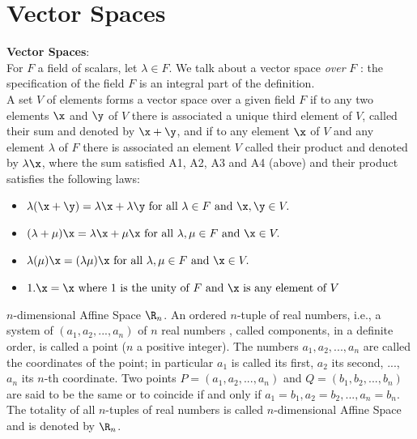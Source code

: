 \section{Vector Spaces}

\begin{definition}{\bf Vector Spaces}:\\
For $F$ a field of scalars, let $\lambda \in F$. We talk about a vector space {\it over } $F$ : the specification of the field $F$ is an integral part of the definition. \\

A set $V$ of elements forms a vector space over a given field $F$ if to any two elements $\x$ and $\y$ of $V$ there is associated a unique third element of $V$, called their sum and denoted by
$\x + \y$, and if to any element $\x$ of $V$ and any element $\lambda$ of $F$ there is associated an element $V$ called their product and denoted by $\lambda \x$, where the sum satisfied A1, A2, A3 and A4 (above)
and their product satisfies the following laws: 
 
\begin{itemize}
\item[V1:]  $\lambda (\x + \y) = \lambda\x + \lambda\y \mbox{ for all } \lambda \in F \mbox{ and } \x,\y \in  V.$
\item[V2:]  $(\lambda + \mu)\x = \lambda\x + \mu\x \mbox{ for all } \lambda,\mu \in F \mbox{ and } \x  \in  V.$
\item[V3:]  $\lambda(\mu)\x = (\lambda\mu)\x \mbox{ for all } \lambda,\mu \in F \mbox{ and } \x  \in  V.$
\item[V4:]  $1.\x = \x \mbox{ where 1 is the unity of }  F \mbox{ and } \x \mbox{ is any element of } V$
\end{itemize}
\end{definition}

\begin{definition}
$n$-dimensional Affine Space $\R_n$. An ordered $n$-tuple of real numbers, i.e., a system of $(a_1, a_2, ..., a_n)$ of $n$ real numbers , called components, in a definite order, is called a point ($n$ a positive integer). The numbers $a_1,a_2, ...,a_n$ are called the coordinates of the point; in particular $a_1$ is called its first, $a_2$ its second, ..., $a_n$ its $n$-th coordinate. Two points $P=(a_1,a_2,...,a_n)$ and $Q = (b_1,b_2,...,b_n)$ are said to 
be the {\elevenit same} or to coincide if and only if $a_1 = b_1, a_2 = b_2, ..., a_n = b_n$. The totality of all $n$-tuples of real numbers is called $n$-dimensional Affine Space and is denoted by $\R_n$.
\end{definition}

